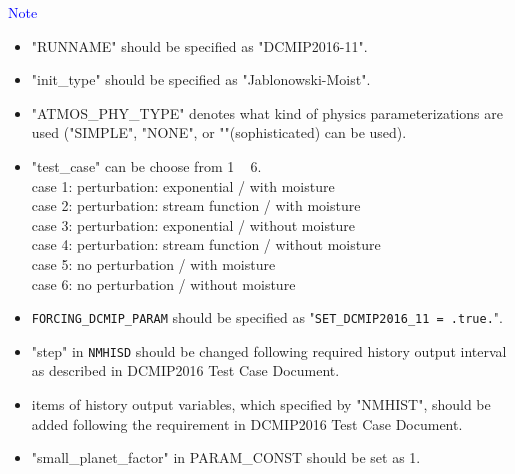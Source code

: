  \noindent \textcolor{blue}{{\sf Note}}
 \begin{itemize}
   \item "RUNNAME" should be specified as "DCMIP2016-11".
   \item "init\_type" should be specified as "Jablonowski-Moist".
   \item "ATMOS\_PHY\_TYPE" denotes what kind of physics parameterizations are
     used ("SIMPLE", "NONE", or ""(sophisticated) can be used).
   \item "test\_case" can be choose from 1 ~ 6.\\
          case 1: perturbation: exponential / with moisture \\
          case 2: perturbation: stream function / with moisture \\
          case 3: perturbation: exponential / without moisture \\
          case 4: perturbation: stream function / without moisture \\
          case 5: no perturbation / with moisture \\
          case 6: no perturbation / without moisture
   \item \verb|FORCING_DCMIP_PARAM| should be specified as "\verb|SET_DCMIP2016_11 = .true.|".
   \item "step" in \verb|NMHISD| should be changed following required history output interval
           as described in DCMIP2016 Test Case Document.
   \item items of history output variables, which specified by "NMHIST", should be added
         following the requirement in DCMIP2016 Test Case Document.
   \item "small\_planet\_factor" in PARAM\_CONST should be set as 1.
 \end{itemize}

 \vspace{0.5cm}

